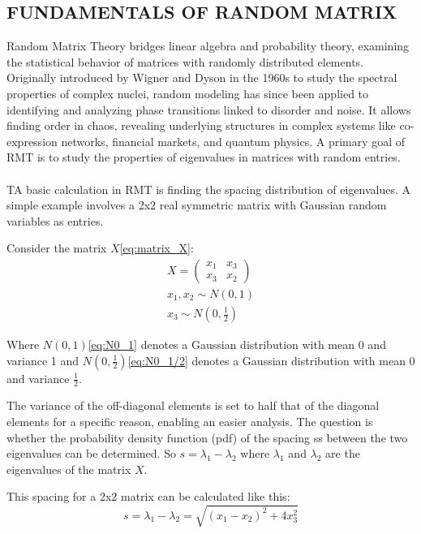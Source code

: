 \subsection{FUNDAMENTALS OF RANDOM MATRIX}\label{subsec:fundamentals-of-random-matrix}

Random Matrix Theory bridges linear algebra and probability theory\cite{vivo_random_2017}, examining the statistical behavior of matrices with randomly distributed elements.
Originally introduced by Wigner and Dyson in the 1960s to study the spectral properties of complex nuclei, random modeling has since been applied to identifying and analyzing phase transitions linked to disorder and noise\cite{deng_molecular_2012}.
It allows finding order in chaos, revealing underlying structures in complex systems like co-expression networks\cite{luo_constructing_2007}, financial markets\cite{pharasi_complex_2018}, and quantum physics\cite{guhr_random_1997}.
A primary goal of RMT is to study the properties of eigenvalues in matrices with random entries.
\\\\
\noindent TA basic calculation in RMT is finding the spacing distribution of eigenvalues.
A simple example involves a 2x2 real symmetric matrix with Gaussian random variables as entries.

\noindent Consider the matrix $X$\eqref{eq:matrix_X}:
\begin{align}
\label{eq:matrix_X}
X=\begin{pmatrix}
x_1 & x_3\\ x_3 & x_2
\end{pmatrix}\\
\label{eq:N0_1}
x_1, x_2 \sim N(0,1)\\
\label{eq:N0_1/2}
x_3 \sim N(0,\frac{1}{2})
\end{align}


\noindent Where $N(0,1)$\eqref{eq:N0_1} denotes a Gaussian distribution with mean 0 and variance 1 and $N(0,\frac{1}{2})$\eqref{eq:N0_1/2} denotes a Gaussian distribution with mean 0 and variance $\frac{1}{2}$.

The variance of the off-diagonal elements is set to half that of the diagonal elements for a specific reason, enabling an easier analysis.
The question is whether the probability density function (pdf) of the spacing ss between the two eigenvalues can be determined.
So $s=\lambda_1-\lambda_2$ where $\lambda_1$ and $\lambda_2$ are the eigenvalues of the matrix $X$.

\noindent This spacing for a 2x2 matrix can be calculated like this:
\[s = \lambda_1 - \lambda_2 = \sqrt{(x_1 - x_2)^2 + 4x_3^2}\]

